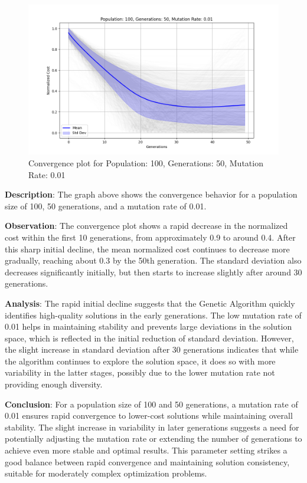\documentclass{article}
\begin{document}
    \begin{figure}[H]
        \centering
        \includegraphics[width=\textwidth]{genetic_algorithm/Population_100_Generations_50_MutationRate_0.01}
        \caption{Convergence plot for Population: 100, Generations: 50, Mutation Rate: 0.01}
        \label{fig:ga_100_50_01}
    \end{figure}

    \textbf{Description}: The graph above shows the convergence behavior for a population size of 100, 50 generations, and a mutation rate of 0.01.

    \textbf{Observation}: The convergence plot shows a rapid decrease in the normalized cost within the first 10 generations, from approximately 0.9 to around 0.4. After this sharp initial decline, the mean normalized cost continues to decrease more gradually, reaching about 0.3 by the 50th generation. The standard deviation also decreases significantly initially, but then starts to increase slightly after around 30 generations.

    \textbf{Analysis}: The rapid initial decline suggests that the Genetic Algorithm quickly identifies high-quality solutions in the early generations. The low mutation rate of 0.01 helps in maintaining stability and prevents large deviations in the solution space, which is reflected in the initial reduction of standard deviation. However, the slight increase in standard deviation after 30 generations indicates that while the algorithm continues to explore the solution space, it does so with more variability in the latter stages, possibly due to the lower mutation rate not providing enough diversity.

    \textbf{Conclusion}: For a population size of 100 and 50 generations, a mutation rate of 0.01 ensures rapid convergence to lower-cost solutions while maintaining overall stability. The slight increase in variability in later generations suggests a need for potentially adjusting the mutation rate or extending the number of generations to achieve even more stable and optimal results. This parameter setting strikes a good balance between rapid convergence and maintaining solution consistency, suitable for moderately complex optimization problems.
\end{document}
